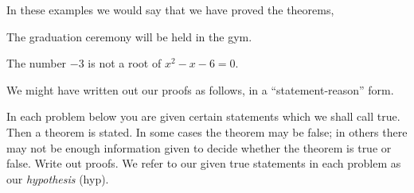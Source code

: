 \documentclass[11pt]{book}
\begin{document}
\medskip
In these examples we would say that we have proved the theorems,

\begin{exlist}
\item The graduation ceremony will be held in the gym.
\item The number $-3$ is not a root of $x^2 - x - 6 = 0$.
\end{exlist}

We might have written out our proofs as follows, in a ``statement-reason'' form.

\begin{steps}
\end{steps}

\begin{steps}
\end{steps}


In each problem below you are given certain statements which we shall call true.
Then a theorem is stated. In some cases the theorem may be false; in others there
may not be enough information given to decide whether the theorem is true or
false. Write out proofs. We refer to our given true statements in each problem as
our \emph{hypothesis} (hyp).
\end{document}
